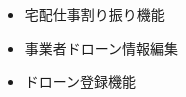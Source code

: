 \documentclass[a4paper, titlepage]{jsarticle}
\begin{document}
\begin{itemize}[labelwidth=\linewidth]
  \item 宅配仕事割り振り機能 %
  \item 事業者ドローン情報編集 %
  \item ドローン登録機能 %
\end{itemize}
\end{document}
